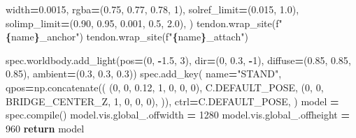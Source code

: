\documentclass[
  chinese,
  11pt,
  letterpaper,
]{article}
\newenvironment{Shaded}{\begin{snugshade}}{\end{snugshade}}
\newcommand{\BuiltInTok}[1]{#1}
\newcommand{\ControlFlowTok}[1]{\textcolor[rgb]{0.13,0.29,0.53}{\textbf{#1}}}
\newcommand{\DecValTok}[1]{\textcolor[rgb]{0.00,0.00,0.81}{#1}}
\newcommand{\FloatTok}[1]{\textcolor[rgb]{0.00,0.00,0.81}{#1}}
\newcommand{\NormalTok}[1]{#1}
\newcommand{\OperatorTok}[1]{\textcolor[rgb]{0.81,0.36,0.00}{\textbf{#1}}}
\newcommand{\SpecialCharTok}[1]{\textcolor[rgb]{0.81,0.36,0.00}{\textbf{#1}}}
\newcommand{\SpecialStringTok}[1]{\textcolor[rgb]{0.31,0.60,0.02}{#1}}
\newcommand{\StringTok}[1]{\textcolor[rgb]{0.31,0.60,0.02}{#1}}
\renewenvironment{Shaded}{\par\smallskip}{\par\smallskip}
\begin{document}
\begin{Shaded}
\begin{Highlighting}[]
\NormalTok{                width}\OperatorTok{=}\FloatTok{0.0015}\NormalTok{,}
\NormalTok{                rgba}\OperatorTok{=}\NormalTok{(}\FloatTok{0.75}\NormalTok{, }\FloatTok{0.77}\NormalTok{, }\FloatTok{0.78}\NormalTok{, }\DecValTok{1}\NormalTok{),}
\NormalTok{                solref\_limit}\OperatorTok{=}\NormalTok{(}\FloatTok{0.015}\NormalTok{, }\FloatTok{1.0}\NormalTok{),}
\NormalTok{                solimp\_limit}\OperatorTok{=}\NormalTok{(}\FloatTok{0.90}\NormalTok{, }\FloatTok{0.95}\NormalTok{, }\FloatTok{0.001}\NormalTok{, }\FloatTok{0.5}\NormalTok{, }\FloatTok{2.0}\NormalTok{),}
\NormalTok{            )}
\NormalTok{            tendon.wrap\_site(}\SpecialStringTok{f"}\SpecialCharTok{\{}\NormalTok{name}\SpecialCharTok{\}}\SpecialStringTok{\_anchor"}\NormalTok{)}
\NormalTok{            tendon.wrap\_site(}\SpecialStringTok{f"}\SpecialCharTok{\{}\NormalTok{name}\SpecialCharTok{\}}\SpecialStringTok{\_attach"}\NormalTok{)}

\NormalTok{    spec.worldbody.add\_light(pos}\OperatorTok{=}\NormalTok{(}\DecValTok{0}\NormalTok{, }\OperatorTok{{-}}\FloatTok{1.5}\NormalTok{, }\DecValTok{3}\NormalTok{), }\BuiltInTok{dir}\OperatorTok{=}\NormalTok{(}\DecValTok{0}\NormalTok{, }\FloatTok{0.3}\NormalTok{, }\OperatorTok{{-}}\DecValTok{1}\NormalTok{),}
\NormalTok{                             diffuse}\OperatorTok{=}\NormalTok{(}\FloatTok{0.85}\NormalTok{, }\FloatTok{0.85}\NormalTok{, }\FloatTok{0.85}\NormalTok{), ambient}\OperatorTok{=}\NormalTok{(}\FloatTok{0.3}\NormalTok{, }\FloatTok{0.3}\NormalTok{, }\FloatTok{0.3}\NormalTok{))}
\NormalTok{    spec.add\_key(}
\NormalTok{        name}\OperatorTok{=}\StringTok{"STAND"}\NormalTok{,}
\NormalTok{        qpos}\OperatorTok{=}\NormalTok{np.concatenate((}
\NormalTok{            (}\DecValTok{0}\NormalTok{, }\DecValTok{0}\NormalTok{, }\FloatTok{0.12}\NormalTok{, }\DecValTok{1}\NormalTok{, }\DecValTok{0}\NormalTok{, }\DecValTok{0}\NormalTok{, }\DecValTok{0}\NormalTok{),}
\NormalTok{            C.DEFAULT\_POSE,}
\NormalTok{            (}\DecValTok{0}\NormalTok{, }\DecValTok{0}\NormalTok{, BRIDGE\_CENTER\_Z, }\DecValTok{1}\NormalTok{, }\DecValTok{0}\NormalTok{, }\DecValTok{0}\NormalTok{, }\DecValTok{0}\NormalTok{),}
\NormalTok{        )),}
\NormalTok{        ctrl}\OperatorTok{=}\NormalTok{C.DEFAULT\_POSE,}
\NormalTok{    )}
\NormalTok{    model }\OperatorTok{=}\NormalTok{ spec.}\BuiltInTok{compile}\NormalTok{()}
\NormalTok{    model.vis.global\_.offwidth }\OperatorTok{=} \DecValTok{1280}
\NormalTok{    model.vis.global\_.offheight }\OperatorTok{=} \DecValTok{960}
    \ControlFlowTok{return}\NormalTok{ model}



\end{Highlighting}
\end{Shaded}
\end{document}
